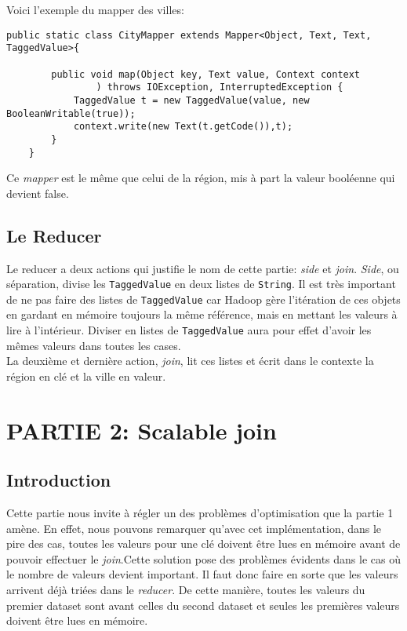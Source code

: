 \documentclass[a4paper]{article}
\begin{document}
Voici l'exemple du mapper des villes:
\begin{lstlisting}
public static class CityMapper extends Mapper<Object, Text, Text, TaggedValue>{

		public void map(Object key, Text value, Context context
				) throws IOException, InterruptedException {
			TaggedValue t = new TaggedValue(value, new BooleanWritable(true));
			context.write(new Text(t.getCode()),t);
		}
	}
\end{lstlisting}
Ce \textit{mapper} est le même que celui de la région, mis à part la valeur booléenne qui devient false.
	
\subsection{Le Reducer}
Le reducer a deux actions qui justifie le nom de cette partie: \textit{side} et \textit{join}. \textit{Side}, ou séparation, divise les \verb?TaggedValue? en deux listes de \verb?String?. Il est très important de ne pas faire des listes de \verb?TaggedValue? car Hadoop gère l'itération de ces objets en gardant en mémoire toujours la même référence, mais en mettant les valeurs à lire à l'intérieur. Diviser en listes de \verb?TaggedValue? aura pour effet d'avoir les mêmes valeurs dans toutes les cases.\\La deuxième et dernière action, \textit{join}, lit ces listes et écrit dans le contexte la région en clé et la ville en valeur.

\section{PARTIE 2: Scalable join}

\subsection{Introduction}
Cette partie nous invite à régler un des problèmes d'optimisation que la partie 1 amène. En effet, nous pouvons remarquer qu'avec cet implémentation, dans le pire des cas, toutes les valeurs pour une clé doivent être lues en mémoire avant de pouvoir effectuer le \textit{join}.Cette solution pose des problèmes évidents dans le cas où le nombre de valeurs devient important. Il faut donc faire en sorte que les valeurs arrivent déjà triées dans le \textit{reducer}. De cette manière, toutes les valeurs du premier dataset sont avant celles du second dataset et seules les premières valeurs doivent être lues en mémoire.
\end{document}
